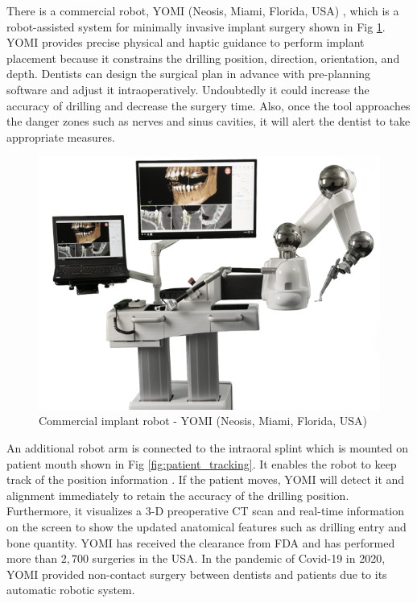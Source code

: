\par
There is a commercial robot, YOMI (Neosis, Miami, Florida, USA) \cite{bolding2021accuracy}\cite{BOLDING2021}, which is a robot-assisted system for minimally invasive implant surgery shown in Fig \ref{fig:YOMI}. YOMI provides precise physical and haptic guidance to perform implant placement because it constrains the drilling position, direction, orientation, and depth. Dentists can design the surgical plan in advance with pre-planning software and adjust it intraoperatively. Undoubtedly it could increase the accuracy of drilling and decrease the surgery time. Also,  once the tool approaches the danger zones such as nerves and sinus cavities, it will alert the dentist to take appropriate measures.
\begin{figure}[htbp]
\begin{center}
\includegraphics[width=0.8\linewidth]{Images/YOMI.png}
\caption{
Commercial implant robot - YOMI (Neosis, Miami, Florida, USA)
}\label{fig:YOMI}
\end{center}
\end{figure}
\par
An additional robot arm is connected to the intraoral splint which is mounted on patient mouth shown in Fig \ref{fig:patient_tracking}. It enables the robot to keep track of the position information \cite{intraoral_splint} . If the patient moves, YOMI will detect it and alignment immediately to retain the accuracy of the drilling position. Furthermore, it visualizes a 3-D preoperative CT scan and real-time information on the screen to show the updated anatomical features such as drilling entry and bone quantity.  YOMI has received the clearance from FDA and has performed more than $2,700$ surgeries in the USA. In the pandemic of Covid-19 in 2020, YOMI provided non-contact surgery between dentists and patients due to its automatic robotic system. 
